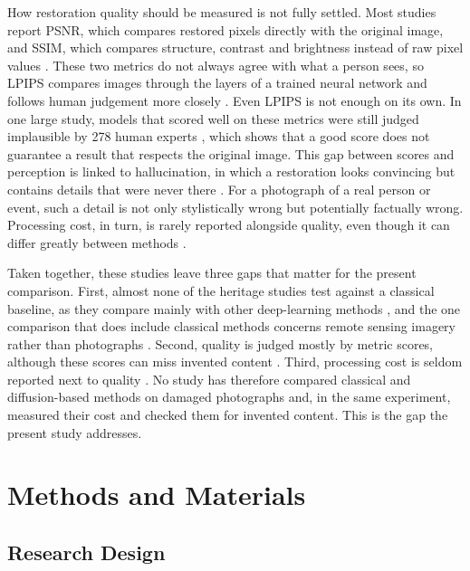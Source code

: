 \documentclass[conference]{IEEEtran}
\begin{document}
How restoration quality should be measured is not fully settled. Most studies report PSNR, which compares restored pixels directly with the original image, and SSIM, which compares structure, contrast and brightness instead of raw pixel values \cite{yang2024}. These two metrics do not always agree with what a person sees, so LPIPS compares images through the layers of a trained neural network and follows human judgement more closely \cite{yang2024}. Even LPIPS is not enough on its own. In one large study, models that scored well on these metrics were still judged implausible by 278 human experts \cite{han2026diffumural}, which shows that a good score does not guarantee a result that respects the original image. This gap between scores and perception is linked to hallucination, in which a restoration looks convincing but contains details that were never there \cite{peng2026dcadif}. For a photograph of a real person or event, such a detail is not only stylistically wrong but potentially factually wrong. Processing cost, in turn, is rarely reported alongside quality, even though it can differ greatly between methods \cite{yue2025}.

Taken together, these studies leave three gaps that matter for the present comparison. First, almost none of the heritage studies test against a classical baseline, as they compare mainly with other deep-learning methods \cite{peng2026dcadif,hu2025guidepaint,zhao2026apldiff,han2026diffumural}, and the one comparison that does include classical methods concerns remote sensing imagery rather than photographs \cite{sekrecka2025}. Second, quality is judged mostly by metric scores, although these scores can miss invented content \cite{peng2026dcadif,han2026diffumural}. Third, processing cost is seldom reported next to quality \cite{yue2025}. No study has therefore compared classical and diffusion-based methods on damaged photographs and, in the same experiment, measured their cost and checked them for invented content. This is the gap the present study addresses.

\section{Methods and Materials}
\label{sec:methods}

\subsection*{Research Design}
\end{document}
